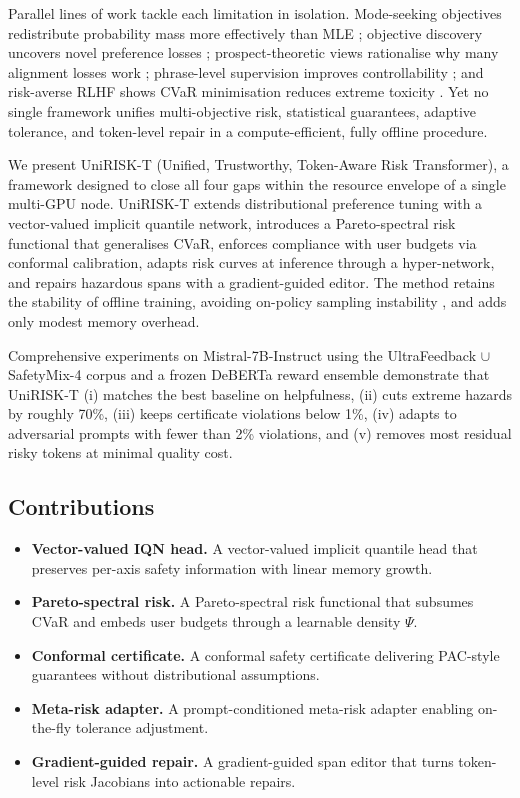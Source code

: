 \documentclass{article}
\begin{document}
Parallel lines of work tackle each limitation in isolation. Mode-seeking objectives redistribute probability mass more effectively than MLE \cite{tajwar-2024-preference}; objective discovery uncovers novel preference losses \cite{lu-2024-discovering}; prospect-theoretic views rationalise why many alignment losses work \cite{ethayarajh-2024-model}; phrase-level supervision improves controllability \cite{guo-2023-beyond}; and risk-averse RLHF shows CVaR minimisation reduces extreme toxicity \cite{chaudhary-2025-risk}. Yet no single framework unifies multi-objective risk, statistical guarantees, adaptive tolerance, and token-level repair in a compute-efficient, fully offline procedure.

We present UniRISK-T (Unified, Trustworthy, Token-Aware Risk Transformer), a framework designed to close all four gaps within the resource envelope of a single multi-GPU node. UniRISK-T extends distributional preference tuning with a vector-valued implicit quantile network, introduces a Pareto-spectral risk functional that generalises CVaR, enforces compliance with user budgets via conformal calibration, adapts risk curves at inference through a hyper-network, and repairs hazardous spans with a gradient-guided editor. The method retains the stability of offline training, avoiding on-policy sampling instability \cite{baheti-2023-leftover}, and adds only modest memory overhead.

Comprehensive experiments on Mistral-7B-Instruct using the UltraFeedback $\cup$ SafetyMix-4 corpus and a frozen DeBERTa reward ensemble demonstrate that UniRISK-T (i) matches the best baseline on helpfulness, (ii) cuts extreme hazards by roughly 70\%, (iii) keeps certificate violations below 1\%, (iv) adapts to adversarial prompts with fewer than 2\% violations, and (v) removes most residual risky tokens at minimal quality cost.

\subsection{Contributions}
\begin{itemize}
  \item \textbf{Vector-valued IQN head.} A vector-valued implicit quantile head that preserves per-axis safety information with linear memory growth.
  \item \textbf{Pareto-spectral risk.} A Pareto-spectral risk functional that subsumes CVaR and embeds user budgets through a learnable density $\Psi$.
  \item \textbf{Conformal certificate.} A conformal safety certificate delivering PAC-style guarantees without distributional assumptions.
  \item \textbf{Meta-risk adapter.} A prompt-conditioned meta-risk adapter enabling on-the-fly tolerance adjustment.
  \item \textbf{Gradient-guided repair.} A gradient-guided span editor that turns token-level risk Jacobians into actionable repairs.
\end{itemize}
\end{document}
